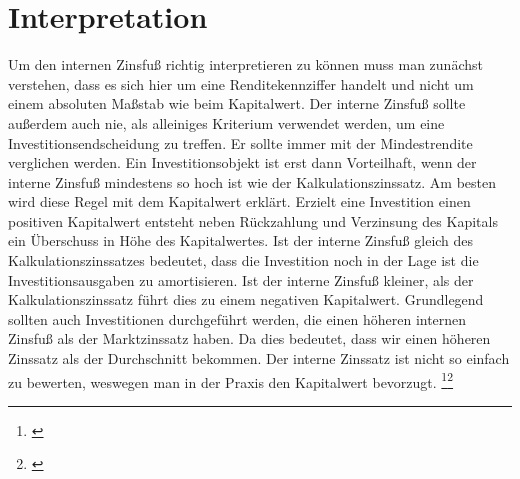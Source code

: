 \section{Interpretation}
Um den internen Zinsfuß richtig interpretieren zu können muss man zunächst verstehen, dass es sich hier um eine Renditekennziffer handelt und nicht um einem absoluten Maßstab wie beim Kapitalwert. Der interne Zinsfuß sollte außerdem auch nie, als alleiniges Kriterium verwendet werden, um eine Investitionsendscheidung zu treffen. Er sollte immer mit der Mindestrendite verglichen werden. Ein Investitionsobjekt ist erst dann Vorteilhaft, wenn der interne Zinsfuß mindestens so hoch ist wie der Kalkulationszinssatz. Am besten wird diese Regel mit dem Kapitalwert erklärt. Erzielt eine Investition einen positiven Kapitalwert entsteht neben Rückzahlung und Verzinsung des Kapitals ein Überschuss in Höhe des Kapitalwertes. Ist der interne Zinsfuß gleich des Kalkulationszinssatzes bedeutet, dass die Investition noch in der Lage ist die Investitionsausgaben zu amortisieren. Ist der interne Zinsfuß kleiner, als der Kalkulationszinssatz führt dies zu einem negativen Kapitalwert. Grundlegend sollten auch Investitionen durchgeführt werden, die einen höheren internen Zinsfuß als der Marktzinssatz haben. Da dies bedeutet, dass wir einen höheren Zinssatz als der Durchschnitt bekommen. Der interne Zinssatz ist nicht so einfach zu bewerten, weswegen man in der Praxis den Kapitalwert bevorzugt.
\footnote{\cite{lex-interner-zinsfuss}}\footnote{\cite{studyflix-interner-zinsfuss}}